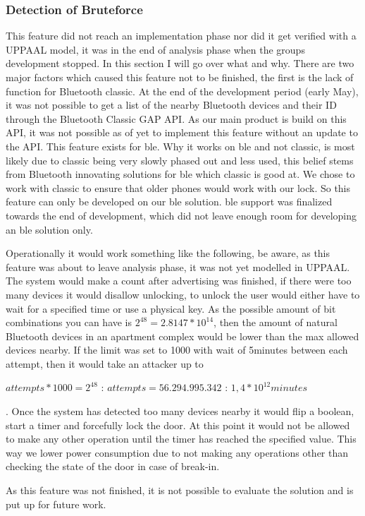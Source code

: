 \subsubsection{Detection of Bruteforce}
This feature did not reach an implementation phase nor did it get verified with a UPPAAL model, it was in the end of analysis phase when the groups development stopped. In this section I will go over what and why. There are two major factors which caused this feature not to be finished, the first is the lack of function for Bluetooth classic\cite{ESPClassicAPI}. At the end of the development period (early May), it was not possible to get a list of the nearby Bluetooth devices and their ID through the Bluetooth Classic GAP API. As our main product is build on this API, it was not possible as of yet to implement this feature without an update to the API. This feature exists for \gls{ble}\cite{ESPBLEGAP}. Why it works on \gls{ble} and not classic, is most likely due to classic being very slowly phased out and less used, this belief stems from Bluetooth innovating solutions for \gls{ble} which classic is good at\cite{BLEAudio}. We chose to work with classic to ensure that older phones would work with our lock. So this feature can only be developed on our \gls{ble} solution. \gls{ble} support was finalized towards the end of development, which did not leave enough room for developing an \gls{ble} solution only.

Operationally it would work something like the following, be aware, as this feature was about to leave analysis phase, it was not yet modelled in UPPAAL. The system would make a count after advertising was finished, if there were too many devices it would disallow unlocking, to unlock the user would either have to wait for a specified time or use a physical key. As the possible amount of bit combinations you can have is $2^{48}=2.8147*10^{14}$, then the amount of natural Bluetooth devices in an apartment complex would be lower than the max allowed devices nearby. If the limit was set to 1000 with wait of 5minutes between each attempt, then it would take an attacker up to 
\begin{center}
$attempts*1000=2^{48}$ : $attempts=56.294.995.342$ : $1,4*10^{12}minutes$
\end{center}.
Once the system has detected too many devices nearby it would flip a boolean, start a timer and forcefully lock the door. At this point it would not be allowed to make any other operation until the timer has reached the specified value. This way we lower power consumption due to not making any operations other than checking the state of the door in case of break-in.

As this feature was not finished, it is not possible to evaluate the solution and is put up for future work.